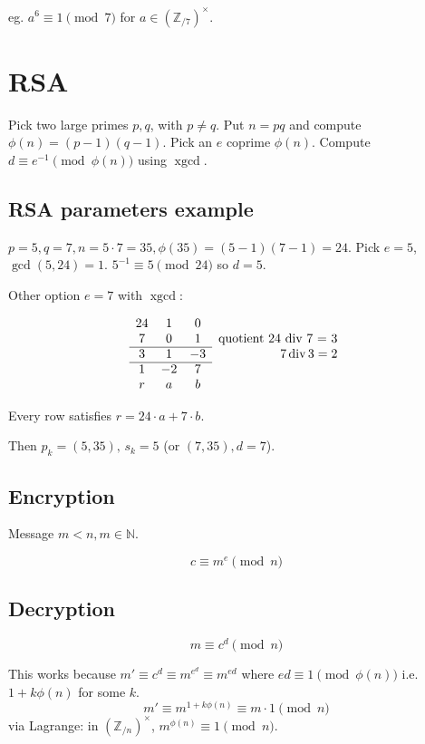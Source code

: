 \documentclass{article}
\newcommand{\ZZ}{\mathbb{Z}}
\newcommand{\NN}{\mathbb{N}}
\newcommand{\xgcd}{\operatorname{xgcd}}
\newcommand{\ZZx}[1]{(\ZZ_{/#1})^\times}
\begin{document}
eg. $a^6 \equiv 1 \pmod{7}$ for $a \in \ZZx{7}$.

\section{RSA}

Pick two large primes $p, q$, with $p \ne q$. Put $n = pq$ and compute $\phi(n) = (p-1)(q-1)$.
Pick an $e$ coprime $\phi(n)$. Compute $d \equiv e^{-1} \pmod{\phi(n)}$ using $\xgcd$.

\subsection{RSA parameters example}\label{sec:rsaexample}

$p = 5, q = 7, n = 5 \cdot 7 = 35, \phi(35) = (5 - 1)(7-1) = 24$. Pick $e = 5$, $\gcd(5, 24) = 1$.
$5^{-1} \equiv 5 \pmod{24}$ so $d=5$.

Other option $e = 7$ with $\xgcd$:

$$\begin{array}{cccr}
    24 & 1 & 0 &                              \\
    7  & 0 & 1 & \text{quotient 24 div 7 = 3} \\
    \cline{1-3}
    3  & 1 & -3 & 7 \operatorname{div} 3 = 2 \\
    \cline{1-3}
    1 & -2 & 7 & \\
    r & a  & b &
\end{array}$$

Every row satisfies $r = 24 \cdot a + 7 \cdot b$.

Then $p_k = (5, 35), \, s_k = 5$ (or $(7, 35), d=7$).

\subsection{Encryption}
Message $m < n, m \in \NN$.

\[ c \equiv m^e \pmod{n} \]

\subsection{Decryption}

\[ m \equiv c^d \pmod{n} \]

This works because $m' \equiv c^d \equiv m^{e^d} \equiv m^{ed}$ where
$ed \equiv 1 \pmod{\phi(n)}$ i.e. $1 + k\phi(n)$ for some $k$.
\[ m' \equiv m^{1 + k \phi(n)} \equiv m \cdot 1 \pmod{n} \] via Lagrange:
in $\ZZx{n}$, $m^{\phi(n)} \equiv 1 \pmod{n}$.
\end{document}
